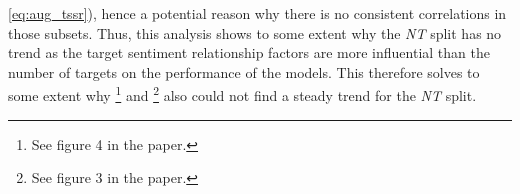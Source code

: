 \ref{eq:aug_tssr}), hence a potential reason why there is no consistent correlations in those subsets. Thus, this analysis shows to some extent why the \textit{NT} split has no trend as the target sentiment relationship factors are more influential than the number of targets on the performance of the models. This therefore solves to some extent why \citet{zhang-etal-2019-aspect}\footnote{See figure 4 in the paper.} and \citet{he-etal-2018-effective}\footnote{See figure 3 in the paper.} also could not find a steady trend for the \textit{NT} split.


